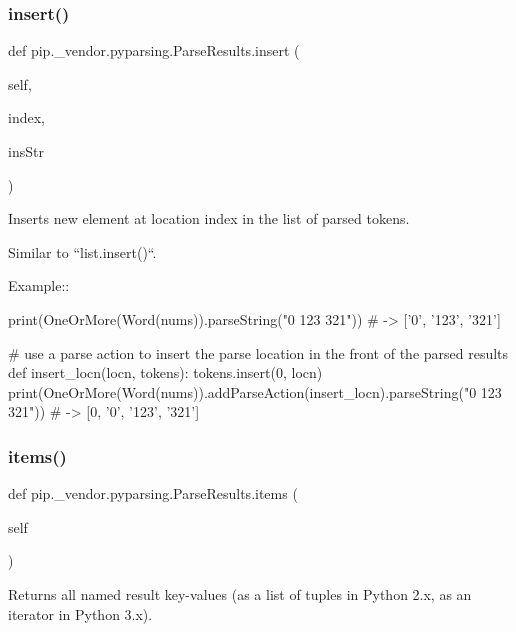 \subsubsection{\texorpdfstring{insert()}{insert()}}
{\footnotesize\ttfamily def pip.\+\_\+vendor.\+pyparsing.\+Parse\+Results.\+insert (\begin{DoxyParamCaption}\item[{}]{self,  }\item[{}]{index,  }\item[{}]{ins\+Str }\end{DoxyParamCaption})}

\begin{DoxyVerb}Inserts new element at location index in the list of parsed tokens.

Similar to ``list.insert()``.

Example::

    print(OneOrMore(Word(nums)).parseString("0 123 321")) # -> ['0', '123', '321']

    # use a parse action to insert the parse location in the front of the parsed results
    def insert_locn(locn, tokens):
tokens.insert(0, locn)
    print(OneOrMore(Word(nums)).addParseAction(insert_locn).parseString("0 123 321")) # -> [0, '0', '123', '321']
\end{DoxyVerb}
 \mbox{\label{classpip_1_1__vendor_1_1pyparsing_1_1ParseResults_a5e38a45b5f9f2ab7750435c9cc83e119}} 
\subsubsection{\texorpdfstring{items()}{items()}}
{\footnotesize\ttfamily def pip.\+\_\+vendor.\+pyparsing.\+Parse\+Results.\+items (\begin{DoxyParamCaption}\item[{}]{self }\end{DoxyParamCaption})}

\begin{DoxyVerb}Returns all named result key-values (as a list of tuples in Python 2.x, as an iterator in Python 3.x).\end{DoxyVerb}
 \mbox{\label{classpip_1_1__vendor_1_1pyparsing_1_1ParseResults_ad1d51ac1224e1ef56c735c9a68fc2e9a}} 
